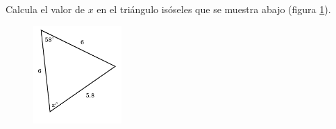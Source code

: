Calcula el valor de $x$ en el triángulo isóseles  que se muestra abajo (figura \ref{fig:findangle11}).
\begin{figure}[H]
    \begin{center}
        \includegraphics[width=0.3\textwidth]{../images/findangle11.png}
    \end{center}
    \caption{}
    \label{fig:findangle11}
\end{figure}